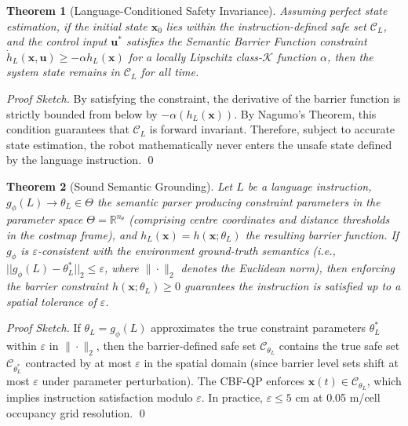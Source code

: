 \documentclass[conference]{IEEEtran}
\newtheorem{theorem}{Theorem}
\begin{document}
\begin{theorem}[Language-Conditioned Safety Invariance]
\label{thm:invariance}
Assuming perfect state estimation, if the initial state $\mathbf{x}_0$ lies within the instruction-defined safe set $\mathcal{C}_L$, and the control input $\mathbf{u}^*$ satisfies the Semantic Barrier Function constraint $\dot{h}_L(\mathbf{x}, \mathbf{u}) \ge -\alpha h_L(\mathbf{x})$ for a locally Lipschitz class-$\mathcal{K}$ function $\alpha$, then the system state remains in $\mathcal{C}_L$ for all time.
\end{theorem}
\begin{proof}[Proof Sketch]
By satisfying the constraint, the derivative of the barrier function is strictly bounded from below by $-\alpha(h_L(\mathbf{x}))$. By Nagumo's Theorem, this condition guarantees that $\mathcal{C}_L$ is forward invariant. Therefore, subject to accurate state estimation, the robot mathematically never enters the unsafe state defined by the language instruction. \qed
\end{proof}

\begin{theorem}[Sound Semantic Grounding]
\label{thm:grounding}
Let $L$ be a language instruction, $g_\phi(L) \rightarrow \theta_L \in \Theta$ the semantic parser producing constraint parameters in the parameter space $\Theta = \mathbb{R}^{n_\theta}$ (comprising centre coordinates and distance thresholds in the costmap frame), and $h_L(\mathbf{x}) = h(\mathbf{x}; \theta_L)$ the resulting barrier function. If $g_\phi$ is $\varepsilon$-consistent with the environment ground-truth semantics (i.e., $||g_\phi(L) - \theta^*_L||_2 \le \varepsilon$, where $\|\cdot\|_2$ denotes the Euclidean norm), then enforcing the barrier constraint $h(\mathbf{x}; \theta_L) \ge 0$ guarantees the instruction is satisfied up to a spatial tolerance of $\varepsilon$.
\end{theorem}
\begin{proof}[Proof Sketch]
If $\theta_L = g_\phi(L)$ approximates the true constraint parameters $\theta^*_L$ within $\varepsilon$ in $\|\cdot\|_2$, then the barrier-defined safe set $\mathcal{C}_{\theta_L}$ contains the true safe set $\mathcal{C}_{\theta^*_L}$ contracted by at most $\varepsilon$ in the spatial domain (since barrier level sets shift at most $\varepsilon$ under parameter perturbation). The CBF-QP enforces $\mathbf{x}(t) \in \mathcal{C}_{\theta_L}$, which implies instruction satisfaction modulo $\varepsilon$. In practice, $\varepsilon \le 5$ cm at 0.05 m/cell occupancy grid resolution. \qed
\end{proof}
\end{document}
